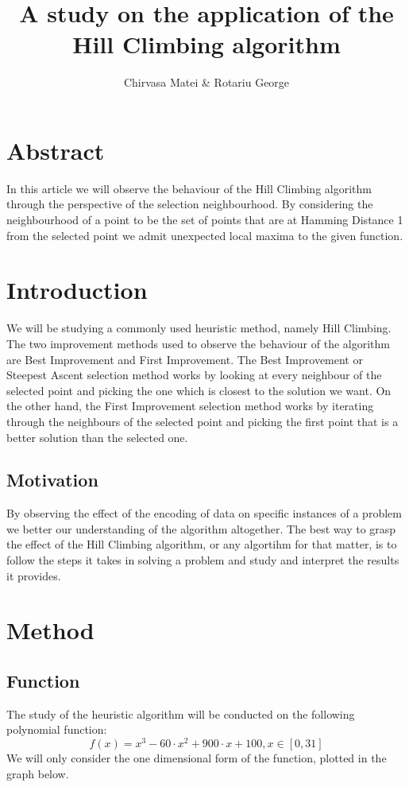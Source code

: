 \documentclass {article}
\author{Chirvasa Matei \& Rotariu George}
\title{A study on the application of the Hill Climbing algorithm}
\begin{document}
\maketitle

\section {Abstract}
In this article we will observe the behaviour of the Hill Climbing algorithm through the perspective of the selection neighbourhood. By considering the neighbourhood of a point to be the set of points that are at Hamming Distance 1 from the selected point we admit unexpected local maxima to the given function.

\section {Introduction}
We will be studying a commonly used heuristic method, namely Hill Climbing. The two improvement methods used to observe the behaviour of the algorithm are Best Improvement and First Improvement. The Best Improvement or Steepest Ascent selection method works by looking at every neighbour of the selected point and picking the one which is closest to the solution we want. On the other hand, the First Improvement selection method works by iterating through the neighbours of the selected point and picking the first point that is a better solution than the selected one.
\subsection{Motivation}
By observing the effect of the encoding of data on specific instances of a problem we better our understanding of the algorithm altogether. The best way to grasp the effect of the Hill Climbing algorithm, or any algortihm for that matter, is to follow the steps it takes in solving a problem and study and interpret the results it provides.


\section {Method}
\subsection{Function}
The study of the heuristic algorithm will be conducted on the following polynomial function:
$$f(x) = x^3 - 60 \cdot x^2 + 900 \cdot x + 100,
x \in \left[ 0, 31 \right]$$
We will only consider the one dimensional form of the function, plotted in the graph below.\\
\end{document}
